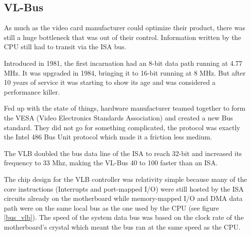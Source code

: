 \subsection{VL-Bus}
As much as the video card manufacturer could optimize their product, there was still a huge bottleneck that was out of their control. Information written by the CPU still had to transit via the ISA bus.\\
\par
 Introduced in 1981, the first incarnation had an 8-bit data path running at 4.77 MHz. It was upgraded in 1984, bringing it to 16-bit running at 8 MHz. But after 10 years of service it was starting to show its age and was considered a performance killer.\\
\par
{}
\par
Fed up with the state of things, hardware manufacturer teamed together to form the VESA (Video Electronics Standards Association) and created a new Bus standard. They did not go for something complicated, the protocol was exactly the Intel 486 Bus Unit protocol which made it a friction less medium.\\
\par 
The VLB doubled the bus data line of the ISA to reach 32-bit and increased its frequency to 33 Mhz, making the VL-Bus 40 to 100 faster than an ISA.\\
\par
The chip design for the VLB controller was relativity simple because many of the core instructions (Interrupts and port-mapped I/O) were still hosted by the ISA circuits already on the motherboard while memory-mapped I/O and DMA data path were on the same local bus as the one used by the CPU (see figure \ref{bus_vlb}). The speed of the system data bus was based on the clock rate of the motherboard's crystal which meant the bus ran at the same speed as the CPU.\\
\par
{}
\label{vlbarchitecture}

